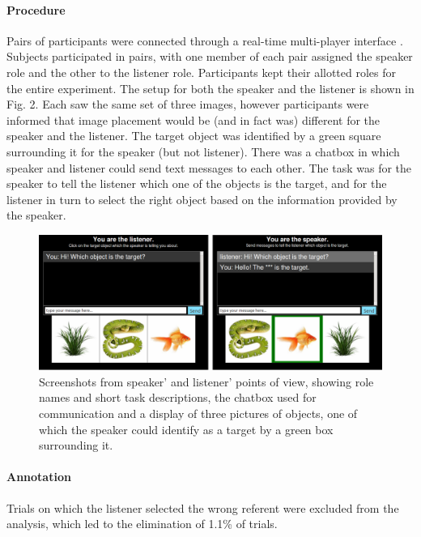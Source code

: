 \documentclass[10pt,letterpaper]{article}
\begin{document}
\paragraph{\bf Procedure}
Pairs of participants were connected through a real-time multi-player interface \cite{Hawkins15_RealTimeWebExperiments}. Subjects participated in pairs, with one member of each pair assigned the speaker role and the other to the listener role. Participants kept their allotted roles for the entire experiment. 
The setup for both the speaker and the listener is shown in Fig. 2. Each saw the same set of three images, however participants were informed that image placement would be (and in fact was) different for the speaker and the listener. The target object was identified by a green square surrounding it for the speaker (but not listener). There was a chatbox in which speaker and listener could send text messages to each other. The task was for the speaker to tell the listener which one of the objects is the target, and for the listener in turn to select the right object based on the information provided by the speaker. 

\begin{figure}[ht!]
\centering
\includegraphics[width=.5\textwidth]{graphs/procedure}
\caption{Screenshots from speaker' and listener' points of view, showing role names and short task descriptions, the chatbox used for communication and a display of three pictures of objects, one of which the speaker could identify as a target by a green box surrounding it.}
\label{fig:procedure}
\end{figure}

\paragraph{\bf Annotation}
Trials on which the listener selected the wrong referent were excluded from the analysis, which led to the elimination of 1.1\% of trials.
 
\end{document}
